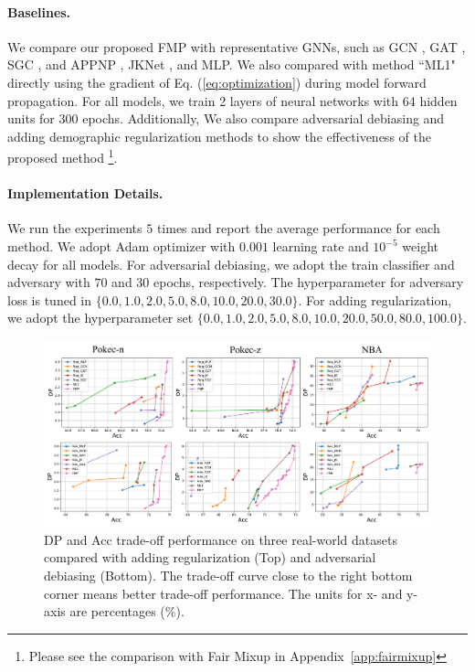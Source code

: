 \documentclass[letterpaper]{article} %
\theoremstyle{plain}
\theoremstyle{definition}
\theoremstyle{remark}
\begin{document}
\paragraph{Baselines.} We compare our proposed FMP with representative GNNs, such as GCN \citep{kipf2017semi}, GAT \citep{velivckovic2018graph}, SGC \citep{wu2019simplifying}, and APPNP \citep{klicpera2019predict}, JKNet \citep{xu2018representation}, and MLP. We also compared with method ``ML1" directly using the gradient of Eq. (\ref{eq:optimization}) during model forward propagation. For all models, we train 2 layers of neural networks with 64 hidden units for $300$ epochs. Additionally, We also compare adversarial debiasing and adding demographic regularization methods to show the effectiveness of the proposed method \footnote{Please see the comparison with Fair Mixup \citep{chuang2021fair} in Appendix~\ref{app:fairmixup}}.


\paragraph{Implementation Details.} We run the experiments $5$ times and report the average performance for each method. We adopt Adam optimizer with $0.001$ learning rate and $10^{-5}$ weight decay for all models.
For adversarial debiasing, we adopt the train classifier and adversary with $70$ and $30$ epochs, respectively. 
The hyperparameter for adversary loss is tuned in $\{0.0, 1.0, 2.0, 5.0, 8.0, 10.0, 20.0, 30.0\}$. For adding regularization, we adopt the hyperparameter set $\{0.0, 1.0, 2.0, 5.0, 8.0, 10.0, 20.0, 50.0, 80.0, 100.0\}$. 


\begin{figure}[t]
\centering
\includegraphics[width=0.95\linewidth]{Tradeoff_all.pdf}

\caption{DP and Acc trade-off performance on three real-world datasets compared with adding regularization (Top) and adversarial debiasing (Bottom). The trade-off curve close to the right bottom corner means better trade-off performance. The units for x- and y-axis are percentages ($\%$).}
\label{fig:pareto}
\end{figure}
\end{document}
